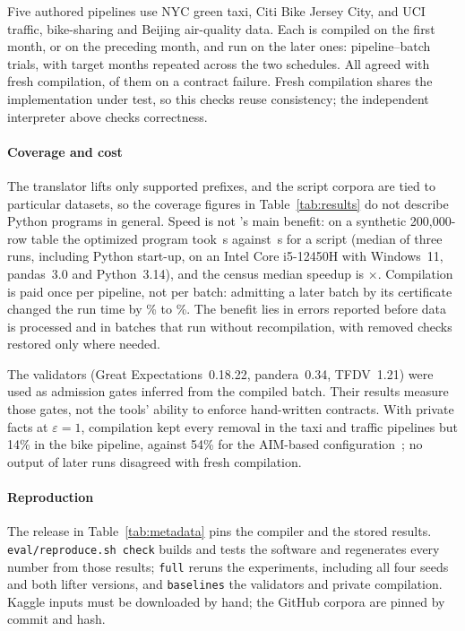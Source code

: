 Five authored pipelines use NYC green taxi, Citi Bike Jersey City, and UCI traffic, bike-sharing and
Beijing air-quality data. Each is compiled on the first month, or on the preceding month, and run on the
later ones: \RealRuns{} pipeline--batch trials, with target months repeated across the two schedules. All
agreed with fresh compilation, \RealFreshFails{} of them on a contract failure. Fresh compilation shares
the implementation under test, so this checks reuse consistency; the independent interpreter above checks
correctness.

\paragraph{Coverage and cost}
The translator lifts only supported prefixes, and the script corpora are tied to particular datasets, so
the coverage figures in Table~\ref{tab:results} do not describe Python programs in general. Speed is not
\PL's main benefit: on a synthetic 200{,}000-row table the optimized program took \TabOpt\,s against
\TabBase\,s for a script (median of three runs, including Python start-up, on an Intel Core i5-12450H
with Windows~11, pandas~3.0 and Python~3.14), and the census median speedup is \CenSpeedMed$\times$.
Compilation is paid once per pipeline, not per batch: admitting a later batch by its certificate changed
the run time by \OhPctLow\% to \OhPctHigh\%. The benefit lies in errors reported before data is processed
and in batches that run without recompilation, with removed checks restored only where needed.

The validators (Great Expectations~0.18.22, pandera~0.34, TFDV~1.21) were used as admission gates
inferred from the compiled batch. Their results measure those gates, not the tools' ability to enforce
hand-written contracts. With private facts at $\varepsilon=1$, compilation kept every removal in the taxi
and traffic pipelines but 14\% in the bike pipeline, against 54\% for the AIM-based
configuration~\cite{mckenna2022aim}; no output of \PrivRuns{} later runs disagreed with fresh compilation.

\paragraph{Reproduction}
The release in Table~\ref{tab:metadata} pins the compiler and the stored results.
\texttt{eval/\allowbreak reproduce.sh check} builds and tests the software and regenerates every number
from those results; \texttt{full} reruns the experiments, including all four seeds and both lifter
versions, and \texttt{baselines} the validators and private compilation. Kaggle inputs must be downloaded
by hand; the GitHub corpora are pinned by commit and hash.

